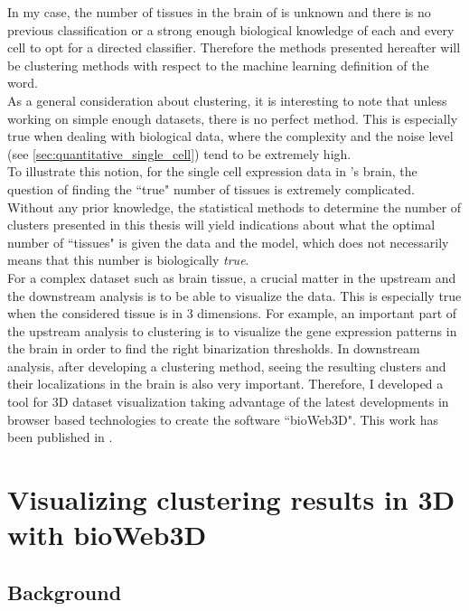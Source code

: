 	In my case, the number of tissues in the brain of \platy{} is unknown and there is no previous classification or a strong enough biological knowledge of each and every cell to opt for a directed classifier. Therefore the methods presented hereafter will be clustering methods with respect to the machine learning definition of the word.\\
	
	As a general consideration about clustering, it is interesting to note that unless working on simple enough datasets, there is no perfect method. This is especially true when dealing with biological data, where the complexity and the noise level (see \ref{sec:quantitative_single_cell}) tend to be extremely high. \\
	
	To illustrate this notion, for the single cell expression data in \platy{}'s brain, the question of finding the ``true" number of tissues is extremely complicated. Without any prior knowledge, the statistical methods to determine the number of clusters presented in this thesis will yield indications about what the optimal number of ``tissues" is given the data and the model, which does not necessarily means that this number is biologically \emph{true}.\\
	
	For a complex dataset such as brain tissue, a crucial matter in the upstream and the downstream analysis is to be able to visualize the data. This is especially true when the considered tissue is in 3 dimensions. For example, an important part of the upstream analysis to clustering is to visualize the gene expression patterns in the brain in order to find the right binarization thresholds. In downstream analysis, after developing a clustering method, seeing the resulting clusters and their localizations in the brain is also very important. Therefore, I developed a tool for 3D dataset visualization taking advantage of the latest developments in browser based technologies to create the software ``bioWeb3D". This work has been published in \cite{Pettit13}.
	
	

\section{Visualizing clustering results in 3D with bioWeb3D}
	\subsection{Background}

